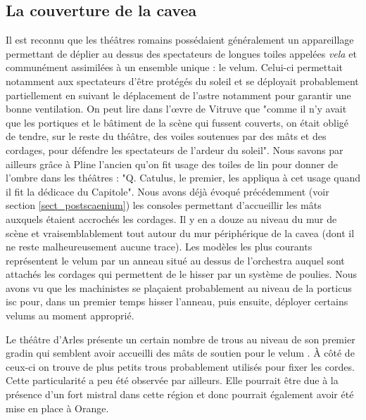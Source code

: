 		\subsection{La couverture de la \gls{cavea}} \label{section velum}
		
		Il est reconnu que les théâtres romains possédaient généralement un appareillage permettant de déplier au dessus des spectateurs de longues toiles appelées \textit{vela} et communément assimilées à un ensemble unique : le \gls{velum}. Celui-ci permettait notamment aux spectateurs d'être protégés du soleil et se déployait probablement partiellement en suivant le déplacement de l'astre notamment pour garantir une bonne ventilation. On peut lire dans l'\oe{}vre de Vitruve\cite[p. 38]{vitruve} que "comme il n'y avait que les portiques et le bâtiment de la scène qui fussent couverts, on était obligé de tendre, sur le reste du théâtre, des voiles soutenues par des mâts et des cordages, pour défendre les spectateurs de l'ardeur du soleil". Nous savons par ailleurs grâce à Pline l'ancien \cite[V-VI]{pline} qu'on fit usage des toiles de lin pour donner de l'ombre dans les théâtres : "Q. Catulus, le premier, les appliqua à cet usage quand il fit la dédicace du Capitole". Nous avons déjà évoqué précédemment (voir section \ref{sect_postscaenium}) les \glspl{console} permettant d'accueillir les mâts auxquels étaient accrochés les cordages. Il y en a douze au niveau du mur de scène et vraisemblablement tout autour du mur périphérique de la \gls{cavea} (dont il ne reste malheureusement aucune trace). Les modèles les plus courants représentent le \gls{velum} par un anneau situé au dessus de l'\gls{orchestra} auquel sont attachés les cordages qui permettent de le hisser par un système de poulies. Nous avons vu que les machinistes se plaçaient probablement au niveau de la \gls{porticus isc} pour, dans un premier temps hisser l'anneau, puis ensuite, déployer certains \glspl{velum} au moment approprié.  
		
		Le théâtre d'Arles présente un certain nombre de trous au niveau de son premier gradin qui semblent avoir accueilli des mâts de soutien pour le \gls{velum} \cite[p. 38]{formige}. À côté de ceux-ci on trouve de plus petits trous probablement utilisés pour fixer les cordes. Cette particularité a peu été observée par ailleurs. Elle pourrait être due à la présence d'un fort mistral dans cette région et donc pourrait également avoir été mise en place à Orange. 

